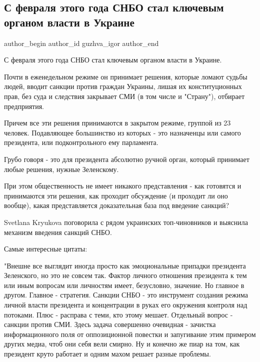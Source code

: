  
 
 
 
 
 
\subsection{С февраля этого года СНБО стал ключевым органом власти в Украине}
\label{sec:27_08_2021.fb.guzhva_igor.1.rnbo_vlast}
 
\ifcmt
 author_begin
   author_id guzhva_igor
 author_end
\fi

С февраля этого года СНБО стал ключевым органом власти в Украине.

Почти в еженедельном режиме он принимает решения, которые ломают судьбы людей,
вводит санкции против граждан Украины, лишая их конституционных прав, без суда
и следствия закрывает СМИ (в том числе и "Страну"), отбирает предприятия.

Причем все эти решения принимаются в закрытом режиме, группой из 23 человек.
Подавляющее большинство из которых - это назначенцы или самого президента, или
подконтрольного ему парламента.

Грубо говоря - это для президента абсолютно ручной орган, который принимает
любые решения, нужные Зеленскому.

При этом общественность не имеет никакого представления - как готовятся и
принимаются эти решения, как проходит обсуждение (и проходит ли оно вообще),
какая представляется доказательная база под введение санкций?

Svetlana Kryukova поговорила с рядом украинских топ-чиновников и выяснила
механизм введения санкций СНБО.

Самые интересные цитаты:

"Внешне все выглядит иногда просто как эмоциональные припадки президента
Зеленского, но это не совсем так. Фактор личного отношения президента к тем или
иным вопросам или личностям имеет, безусловно, значение. Но главное в другом.
Главное - стратегия. Санкции СНБО - это инструмент создания режима личной
власти президента и концентрации в руках его окружения контроля над потоками.
Плюс - расправа с теми, кто этому мешает. Отдельный вопрос - санкции против
СМИ. Здесь задача совершенно очевидная - зачистка информационного поля от
оппозиционной повестки и запугивание этим примером других медиа, чтоб они себя
вели смирно. Ну и конечно же пиар на том, как президент круто работает и одним
махом решает разные проблемы.

